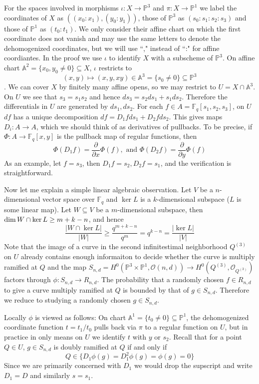 \documentclass[12pt]{article}
\theoremstyle{plain}
\theoremstyle{definition}
\newcommand{\IA}{\mathbb{A}}
\newcommand{\IF}{\mathbb{F}}
\newcommand{\IP}{\mathbb{P}}
\newcommand{\sO}{\mathcal{O}}
\renewcommand\dim{{\rm dim\,}}
\newcommand{\<}{\langle}
\renewcommand{\>}{\rangle}
\newcommand{\p}{\partial}
\begin{document}
For the spaces involved in morphisms $\iota : X \to \IP^3$ and $\pi : X \to \IP^1$ we label the coordinates of $X$ as $((x_0 : x_1), (y_0 : y_1))$, those of $\IP^3$ as $(s_0 : s_1 : s_2 : s_3)$ and those of $\IP^1$ as $(t_0 : t_1)$. We only consider their affine chart on which the first coordinate does not vanish and may use the same letters to denote the dehomogenized coordinates, but we will use ``," instead of ``:" for affine coordiantes. In the proof we use $\iota$ to identify $X$ with a subscheme of $\IP^3$. On affine chart $\IA^2 = \{ x_0, y_0 \neq 0 \} \subseteq X$, $\iota$ restricts to $$(x, y) \mapsto (x, y, xy) \in \IA^3 = \{s_0 \neq 0\} \subseteq \IP^3$$. We can cover $X$ by finitely many affine opens, so we may restrict to $U = X \cap \IA^3$. On $U$ we see that $s_3 = s_1 s_2$ and hence $ds_3 = s_2 ds_1 + s_1 ds_2$. Therefore the differentials in $U$ are generated by $ds_1, ds_2$. For each $f \in A = \IF_q[s_1, s_2, s_3]$, on $U$ $df$ has a unique decomposition $df = D_1 f ds_1 + D_2 f ds_2$. This gives maps $D_i : A \to A$, which we should think of as derivatives of pullbacks. To be precise, if $\Phi : A \to \IF_q[x, y]$ is the pullback map of regular functions, then $$\Phi(D_1 f) = \frac{\p}{\p x} \Phi(f), \text{ and }\Phi(D_2 f) = \frac{\p}{\p y} \Phi(f)$$ As an example, let $f = s_3$, then $D_1 f = s_2, D_2 f = s_1$, and the verification is straightforward. 

Now let me explain a simple linear algebraic observation. Let $V$ be a $n$-dimensional vector space over $\IF_q$ and $\ker L$ is a $k$-dimensional subspace ($L$ is some linear map). Let $W \subseteq V$ be a $m$-dimensional subspace, then $\dim W \cap \ker L \ge m + k - n$, and hence $$\frac{|W \cap \ker L|}{|W|} \ge \frac{q^{m + k - n}}{q^m} = q^{k - n} = \frac{|\ker L|}{|V|}$$ Note that the image of a curve in the second infinitestimal neighborhood $Q^{(3)}$ on $U$ already contains enough informaiton to decide whether the curve is multiply ramified at $Q$ and the map $S_{n, d} = H^0(\IP^3 \times \IP^1, \sO(n, d)) \to H^0(Q^{(3)}, \sO_{Q^{(3)}})$ factors through $\phi : S_{n, d} \to R_{n, d}$. The probability that a randomly chosen $f \in R_{n, d}$ to give a curve multiply ramified at $Q$ is bounded by that of $g \in S_{n, d}$. Therefore we reduce to studying a randomly chosen $g \in S_{n, d}$.  

Locally $\phi$ is viewed as follows: On chart $\IA^1 = \{t_0 \neq 0 \} \subseteq \IP^1$, the dehomogenized coordinate function $t = t_1/t_0$ pulls back via $\pi$ to a regular function on $U$, but in practice in only means on $U$ we identify $t$ with $y$ or $s_2$. Recall that for a point $Q \in U$, $g \in S_{n, d}$ is doubly ramified at $Q$ if and only if $$Q \in \{ D_1 \phi(g) = D_1^2 \phi(g) = \phi(g) = 0 \}$$ Since we are primarily concerned with $D_1$ we would drop the supscript and write $D_1 = D$ and similarly $s = s_1$. 
\end{document}

